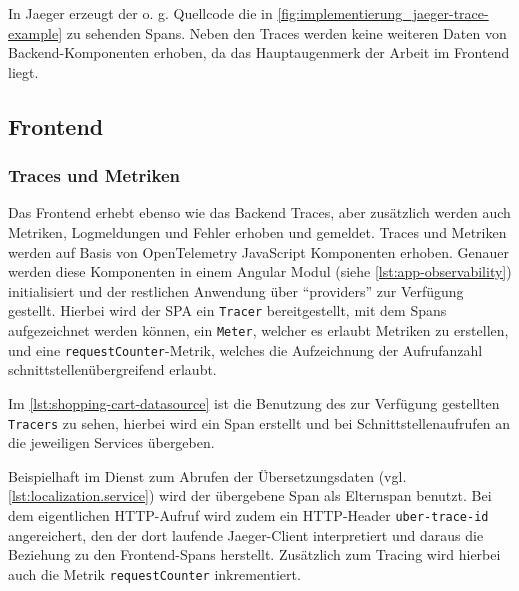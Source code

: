 In Jaeger erzeugt der o. g. Quellcode die in \autoref{fig:implementierung_jaeger-trace-example} zu sehenden Spans. Neben den Traces werden keine weiteren Daten von Backend-Komponenten erhoben, da das Hauptaugenmerk der Arbeit im Frontend liegt.

\subsection{Frontend}

\subsubsection{Traces und Metriken}

Das Frontend erhebt ebenso wie das Backend Traces, aber zusätzlich werden auch Metriken, Logmeldungen und Fehler erhoben und gemeldet. Traces und Metriken werden auf Basis von OpenTelemetry JavaScript Komponenten \cite{OpenTelemetryJS} erhoben. Genauer werden diese Komponenten in einem Angular Modul (siehe \autoref{lst:app-observability}) initialisiert und der restlichen Anwendung über \enquote{providers} zur Verfügung gestellt. Hierbei wird der SPA ein \texttt{Tracer} bereitgestellt, mit dem Spans aufgezeichnet werden können, ein \texttt{Meter}, welcher es erlaubt Metriken zu erstellen, und eine \texttt{requestCounter}-Metrik, welches die Aufzeichnung der Aufrufanzahl schnittstellenübergreifend erlaubt.



Im \autoref{lst:shopping-cart-datasource} ist die Benutzung des zur Verfügung gestellten \texttt{Tracers} zu sehen, hierbei wird ein Span erstellt und bei Schnittstellenaufrufen an die jeweiligen Services übergeben.



Beispielhaft im Dienst zum Abrufen der Übersetzungsdaten (vgl. \autoref{lst:localization.service}) wird der übergebene Span als Elternspan benutzt. Bei dem eigentlichen HTTP-Aufruf wird zudem ein HTTP-Header \texttt{uber-trace-id} angereichert, den der dort laufende Jaeger-Client interpretiert \cite{JaegerClient} und daraus die Beziehung zu den Frontend-Spans herstellt. Zusätzlich zum Tracing wird hierbei auch die Metrik \texttt{requestCounter} inkrementiert.

